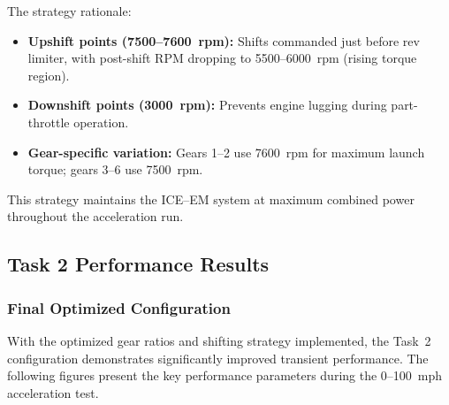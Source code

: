 The strategy rationale:

\begin{itemize}
    \item \textbf{Upshift points (7500--7600~rpm):} Shifts commanded just before rev limiter, with post-shift RPM dropping to 5500--6000~rpm (rising torque region).
    \item \textbf{Downshift points (3000~rpm):} Prevents engine lugging during part-throttle operation.
    \item \textbf{Gear-specific variation:} Gears 1--2 use 7600~rpm for maximum launch torque; gears 3--6 use 7500~rpm.
\end{itemize}

This strategy maintains the ICE--EM system at maximum combined power throughout the acceleration run.

\subsection{Task 2 Performance Results}

\subsubsection{Final Optimized Configuration}

With the optimized gear ratios and shifting strategy implemented, the Task~2 configuration demonstrates significantly improved transient performance. The following figures present the key performance parameters during the 0--100~mph acceleration test.

